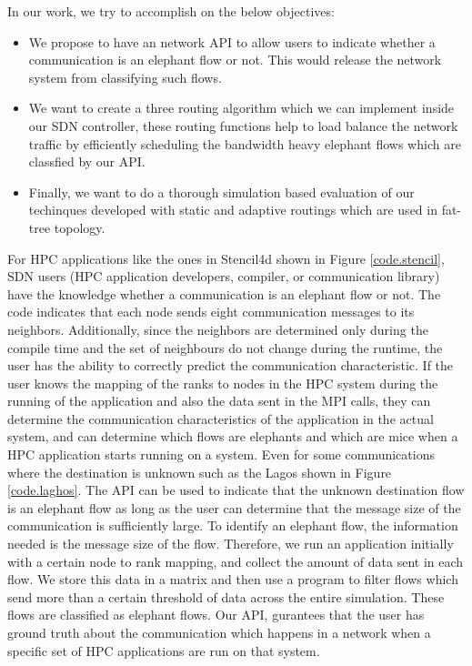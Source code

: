 In our work, we try to accomplish on the below objectives:
\begin{itemize}
\item We propose to have an network API to
allow users to indicate whether a communication is an elephant flow or not. This
would release the network system from classifying such flows.

\item We want to create a three routing algorithm which we can implement inside our
SDN controller, these routing functions help to load balance the network traffic
by efficiently scheduling the bandwidth heavy elephant flows which are classfied by our API.

\item Finally, we want to do a thorough simulation based evaluation of our techinques developed
with static and adaptive routings which are used in fat-tree topology.
\end{itemize}



For HPC applications like the ones in Stencil4d shown in Figure \ref{code.stencil}, SDN
users (HPC application developers, compiler, or communication library) have the
knowledge whether a communication is an elephant flow or not. The code indicates
that each node sends eight communication messages to its neighbors.
Additionally, since the neighbors are determined only during the compile time
and the set of neighbours do not change during the runtime, the user has the
ability to correctly predict the communication characteristic. If the user knows
the mapping of the ranks to nodes in the HPC system during the running of the
application and also the data sent in the MPI calls, they can determine the
communication characteristics of the application in the actual system, and can
determine which flows are elephants and which are mice when a HPC application
starts running on a system. 
Even for some communications where the
destination is unknown such as the Lagos shown in
Figure \ref{code.laghos}. The API can be used to indicate that the unknown destination flow is
an elephant flow as long as the user can determine that the message size of the
communication is sufficiently large.
To identify an elephant flow, the information needed is the message size of the
flow. Therefore, we run an application initially with a certain node to rank mapping, and collect the
amount of data sent in each flow. We store this data in a matrix and then use a program to filter
flows which send more than a certain threshold of data across the entire simulation. 
These flows are classified as elephant flows. Our API, gurantees that the user has ground truth about
the communication which happens in a network when a specific set of HPC applications are run on that 
system.

